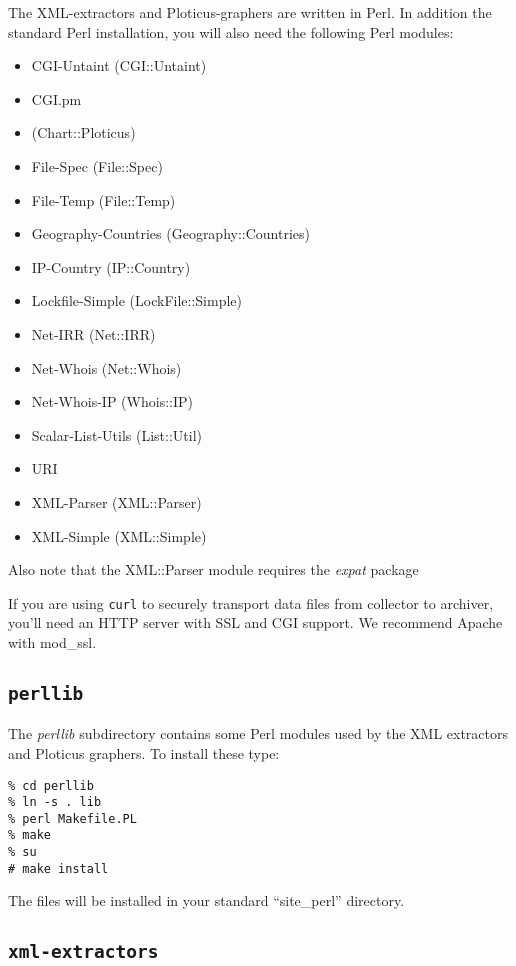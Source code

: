 \documentclass{report}
\begin{document}
The XML-extractors and Ploticus-graphers are written in Perl.  In addition the
standard Perl installation, you will also need the following Perl modules:

\begin{itemize}
	\item CGI-Untaint (CGI::Untaint)
	\item CGI.pm
	\item (Chart::Ploticus)
	\item File-Spec (File::Spec)
	\item File-Temp (File::Temp)
	\item Geography-Countries (Geography::Countries)
	\item IP-Country (IP::Country)
	\item Lockfile-Simple (LockFile::Simple)
	\item Net-IRR (Net::IRR)
	\item Net-Whois (Net::Whois)
	\item Net-Whois-IP (Whois::IP)
	\item Scalar-List-Utils (List::Util)
	\item URI
	\item XML-Parser (XML::Parser)
	\item XML-Simple (XML::Simple)
\end{itemize}

\noindent
Also note that the XML::Parser module requires the {\em expat\/} package

If you are using {\tt curl\/} to securely transport data files from
collector to archiver, you'll need an HTTP server with SSL and CGI support.
We recommend Apache with mod\_ssl.

\subsection{\tt perllib}

The {\em perllib\/} subdirectory contains some Perl modules
used by the XML extractors and Ploticus graphers.  To install
these type:

\begin{verbatim}
% cd perllib
% ln -s . lib
% perl Makefile.PL
% make
% su
# make install
\end{verbatim}

\noindent
The files will be installed in your standard ``site\_perl'' directory.

\subsection{\tt xml-extractors}
\end{document}
